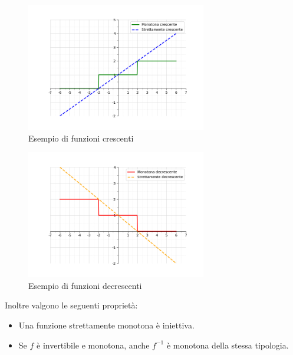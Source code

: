 \begin{figure}[h]
    \centering
    \includegraphics[width=0.7\textwidth]{./img/monotone_crescenti.png}
    \caption{Esempio di funzioni crescenti}
    \label{fig:funzione_crescente}
\end{figure}


\begin{figure}[h]
    \centering
    \includegraphics[width=0.7\textwidth]{./img/monotone_decrescenti.png}
    \caption{Esempio di funzioni decrescenti}
    \label{fig:funzione_decrescente}
\end{figure}

Inoltre valgono le seguenti proprietà:
\begin{itemize}
  \item Una funzione strettamente monotona è iniettiva.
  \item Se $f$ è invertibile e monotona, anche $f^{-1}$ è monotona della stessa tipologia.
\end{itemize}

